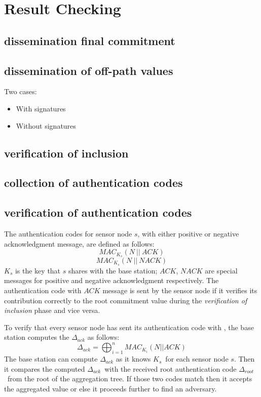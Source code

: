 \chapter{Result Checking}

\section{dissemination final commitment}
\section{dissemination of off-path values}
	Two cases:
	\begin{itemize}
		\item {With signatures}
		\item {Without signatures}
	\end{itemize}
\section{verification of inclusion}
\section{collection of authentication codes}
\section{verification of authentication codes}
	\label{sec:verficiation-of-authentication-codes}
	The authentication codes for sensor node $s$, with either positive or negative acknowledgment message, are defined as follows:
	\begin{equation}
		MAC_{K_{s}}(N\ ||\ \textit{ACK})
	\end{equation}
	\begin{equation}
		MAC_{K_{s}}(N\ ||\ \textit{NACK})
	\end{equation}
	$K_{s}$ is the key that $s$ shares with the base station;
	$\textit{ACK}$, $\textit{NACK}$ are special messages for positive and negative acknowledgment respectively.
	The authentication code with $\textit{ACK}$ message is sent by the sensor node if it verifies its contribution correctly to the root commitment value during the 
	\textit{verification of inclusion} phase and vice versa.
	
	To verify that every sensor node has sent its authentication code with \ack, the base station computes the $\Delta_{ack}$ as follows:
	\begin{equation}
		\displaystyle{\Delta_{ack} = \bigoplus_{i = 1}^n MAC_{K_{i}}(N || ACK) }
	\end{equation}
	The base station can compute $\Delta_{ack}$ as it knows $K_{s}$\ for each sensor node $s$.
	Then it compares the computed $\Delta_{ack}$\ with the received root authentication code $\Delta_{root}$\ from the root of the aggregation tree. 
	If those two codes match then it accepts the aggregated value or else it proceeds further to find an adversary. 

